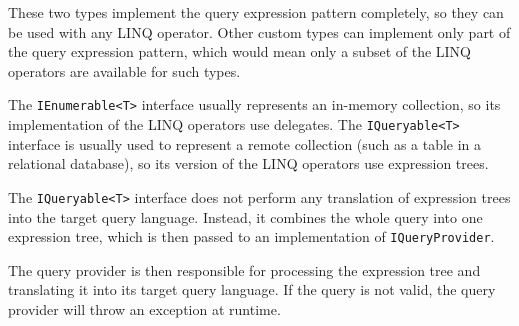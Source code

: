 These two types implement the query expression pattern completely,
so they can be used with any \ac{LINQ} operator.
Other custom types can implement only part of the query expression pattern,
which would mean only a subset of the \ac{LINQ} operators are available for such types.

The \lstinline,IEnumerable<T>, interface usually represents an in-memory collection,
so its implementation of the \ac{LINQ} operators use delegates.
The \lstinline,IQueryable<T>, interface is usually used to represent a remote collection
(such as a table in a relational database),
so its version of the \ac{LINQ} operators use expression trees.

The \lstinline,IQueryable<T>, interface does not perform any translation of expression trees
into the target query language.
Instead, it combines the whole query into one expression tree,
which is then passed to an implementation of \lstinline,IQueryProvider,.

The query provider is then responsible for processing the expression tree
and translating it into its target query language.
If the query is not valid, the query provider will throw an exception at runtime.